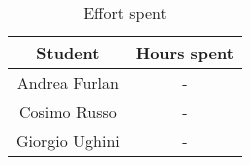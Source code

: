 	
	\begin{table}[htp]
		\centering
		\begin{tabular}{|c|c|}
			\hline
			Student&Hours spent\\
			\hline
			Andrea Furlan&-\\
			\hline
			Cosimo Russo&-\\
			\hline
			Giorgio Ughini&-\\
			\hline
			
		\end{tabular}
		
		\caption{Effort spent} 
		
	\end{table}




